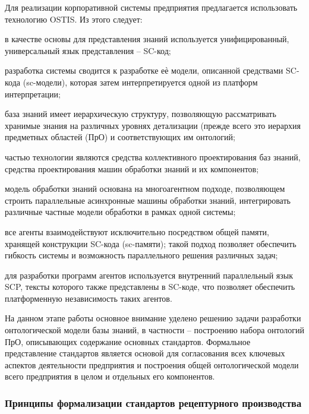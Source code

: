 Для реализации корпоративной системы предприятия предлагается использовать технологию OSTIS. Из этого следует:
\begin{textitemize}
    \item в качестве основы для представления знаний используется унифицированный, универсальный язык представления – SC-код;
    \item разработка системы сводится к разработке еѐ модели, описанной средствами SC-кода (sc-модели), которая затем интерпретируется одной из платформ интерпретации;
    \item база знаний имеет иерархическую структуру, позволяющую рассматривать хранимые знания на различных уровнях детализации (прежде всего это иерархия предметных областей (ПрО) и соответствующих им онтологий;
    \item частью технологии являются средства коллективного проектирования баз знаний, средства проектирования машин обработки знаний и их компонентов;
    \item модель обработки знаний основана на многоагентном подходе, позволяющем строить параллельные асинхронные машины обработки знаний, интегрировать различные частные модели обработки в рамках одной системы;
    \item все агенты взаимодействуют исключительно посредством общей памяти, хранящей конструкции SC-кода (sc-памяти); такой подход позволяет обеспечить гибкость системы и возможность параллельного решения различных задач;
    \item для разработки программ агентов используется внутренний параллельный язык SCP, тексты которого также представлены в SC-коде, что позволяет обеспечить платформенную независимость таких агентов.
\end{textitemize}

На данном этапе работы основное внимание уделено решению задачи разработки онтологической модели базы знаний, в частности – построению набора онтологий ПрО, описывающих содержание основных стандартов. Формальное представление стандартов является основой для согласования всех ключевых аспектов деятельности предприятия и построения общей онтологической модели всего предприятия в целом и отдельных его компонентов.

\subsubsection{Принципы формализации стандартов рецептурного производства}

